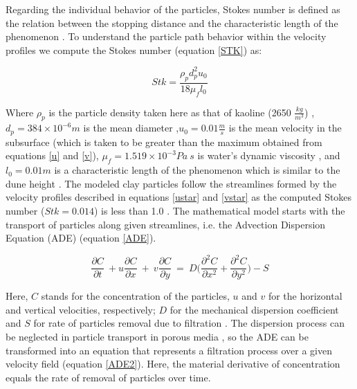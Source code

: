 \documentclass[draft,linenumbers]{agujournal2018}
\begin{document}
Regarding the individual behavior of the particles, Stokes number is defined as the relation between the stopping distance and the characteristic length of the phenomenon \citep{Clark2009}. To understand the particle path behavior within the velocity profiles we compute the Stokes number (equation \ref{STK}) as:

\begin{equation}
\label{STK}
 	Stk = \frac{\rho_p d_p^2 u_0}{18 \mu_f l_0}
\end{equation}

Where $\rho_p$ is the particle density taken here as that of kaoline (2650 $\frac{kg}{m^3}$) \citep{NationalCenterforBiotechnologyInformation}, $d_p=384 \times 10^{-6} m$ is the mean diameter \citep{Fox2014},$u_0=0.01 \frac{m}{s}$ is the mean velocity in the subsurface (which is taken to be greater than the maximum obtained from equations \ref{u} and \ref{v}), $\mu_f=1.519 \times 10^{-3}Pa \ s$ is water's dynamic viscosity \citep{Cengel2006}, and $l_0=0.01 m$ is a characteristic length of the phenomenon which is similar to the dune height \citep{Fox2018}. The modeled clay particles follow the streamlines formed by the velocity profiles described in equations \ref{ustar} and \ref{vstar} as the computed Stokes number ($Stk=0.014$) is less than 1.0 \citep{Tropea2007}. The mathematical model starts with the transport of particles along given streamlines, i.e. the Advection Dispersion Equation (ADE) (equation \ref{ADE}). 

\begin{equation}
 \label{ADE}
 	\frac{\partial C}{\partial t} \ + u \frac{\partial C}{\partial x} \ + \ v \frac{\partial C}{\partial y} \ = \ D \bigg(\frac{\partial^2 C}{\partial x^2} + \frac{\partial^2 C}{\partial y^2}\bigg) - S
\end{equation}

Here, $C$ stands for the concentration of the particles, $u$ and $v$ for the horizontal and vertical velocities, respectively; $D$ for the mechanical dispersion coefficient and $S$ for rate of particles removal due to filtration \citep{Packman1997}. The dispersion process can be neglected in particle transport in porous media \citep{Mau1992}, so the ADE can be transformed into an equation that represents a filtration process over a given velocity field (equation \ref{ADE2}). Here, the material derivative of concentration equals the rate of removal of particles over time.
\end{document}
